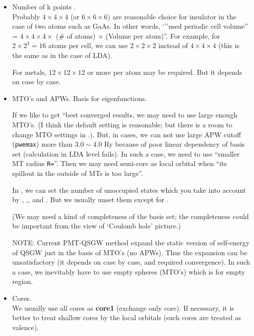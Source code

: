 \begin{itemize}
\item
Number of k points .\\
Probably $4\times 4 \times 4$ (or $6 \times 6 \times 6$)
are reasonable choice for insulator in the case of two atoms such as GaAs. 
In other words, `''used periodic cell volume'' = 
$4\times 4 \times 4 \times$ (\# of atoms) $\times$ (Volume per atom)''.
For example, for $2\times2^3=16$ atoms per cell, we can use $2 \times 2
\times 2$ instead of $4\times 4 \times 4$ (this is the same as in the case of LDA).

For metals, $12 \times 12 \times 12$ or more per atom
may be required. But it depends on case by case.

\item MTO's and APWs. Basis for eigenfunctions.

If we like to get ``best converged results, we may need to use
large enough MTO's.
(I think the default setting is reasonable; 
but there is a room to change MTO settings in .).
But, in cases, we can not use large APW cutoff (\verb#pwemax#) more than
$3.0 \sim 4.0$ Ry because of poor linear dependency of basis set
(calculation in LDA level fails).
In such a case, we need to use ``smaller MT radius \verb#R=#''.
Then we may need semi-core as local orbital when ``its spillout in the
outside of MTs is too large''.

In , we can set the number of unoccupied states
which you take into account by
, ,, and
. But we usually unset them except 
 for .

(We may need a kind of completeness of the basis set;
the completeness could be important from the view of `Coulomb hole' picture.)

NOTE: Current PMT-QSGW method \cite{xxx} expand the static version of
      self-energy of QSGW just in the basis of MTO's (no APWs). Thus the
      expansion can be unsatisfactory (it depends on case by case, and
      required convergence). In such a case, we inevitably
      have to use empty spheres (MTO's) which is for empty region.

\item
Cores.\\
We usually use all cores as {\bf core1} (exchange only core). 
If necessary, it is better to treat shallow cores by the local orbitals
(such cores are treated as valence).


\end{itemize}
